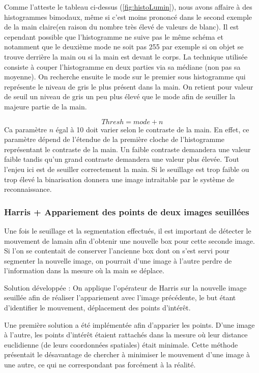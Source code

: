 Comme l’atteste le tableau ci-dessus (\autoref{fig:histoLumin}), nous avons affaire à des histogrammes bimodaux, même si c’est moins prononcé dans le second exemple de la main claire(en raison du nombre très élevé de valeurs de blanc). Il est cependant possible que l’histogramme ne suive pas le même schéma  et notamment que le deuxième mode ne soit pas 255 par exemple si on objet se trouve derrière la main ou si la main est devant le corps.
	La technique utilisée consiste à couper l’histogramme en deux parties via sa médiane (non pas sa moyenne). On recherche ensuite le mode sur le premier sous histogramme qui représente le niveau de gris le plus présent dans la main. On retient pour valeur de seuil un niveau de gris un peu plus élevé que le mode afin de seuiller la majeure partie de la main.

\[
Thresh = mode + n
\]
	Ca paramètre $n$ égal à 10 doit varier selon le contraste de la main. En effet, ce paramètre dépend de l’étendue de la première cloche de l’histogramme représentant le contraste de la main. Un faible contraste demandera une valeur faible tandis qu’un grand contraste demandera une valeur plus élevée. Tout l’enjeu ici est de seuiller correctement la main. Si le seuillage est trop faible ou trop élevé la binarisation donnera une image intraitable par le système de reconnaissance.

\subsubsection{Harris + Appariement des points de deux images seuillées}

Une fois le seuillage et la segmentation effectués, il est important de détecter le mouvement de lamain afin d’obtenir une nouvelle box pour cette seconde image. Si l’on se contentait de conserver l’ancienne box dont on s’est servi pour segmenter la nouvelle image, on pourrait d’une image à l’autre perdre de l’information dans la mesure où la main se déplace.

	Solution développée : On applique l’opérateur de Harris sur la nouvelle image seuillée afin de réaliser l’appariement avec l’image précédente, le but étant d’identifier le mouvement, déplacement des points d’intérêt.

	Une première solution a été implémentée afin d’apparier les points. D’une image à l’autre, les points d’intérêt étaient rattachés dans la mesure où leur distance euclidienne (de leurs coordonnées spatiales) était minimale. Cette méthode présentait le désavantage de chercher à minimiser le mouvement d’une image à une autre, ce qui ne correspondant pas forcément à la réalité.

